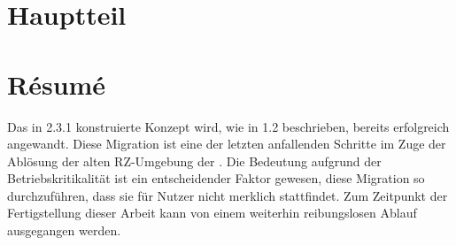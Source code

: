 \section{Hauptteil}
\section{Résumé}

Das in 2.3.1 konstruierte Konzept wird, wie in 1.2 beschrieben, bereits erfolgreich angewandt. Diese Migration ist eine der letzten anfallenden Schritte im Zuge der Ablösung der alten RZ-Umgebung der \Firma. Die Bedeutung aufgrund der Betriebskritikalität ist ein entscheidender Faktor gewesen, diese Migration so durchzuführen, dass sie für Nutzer nicht merklich stattfindet.
Zum Zeitpunkt der Fertigstellung dieser Arbeit kann von einem weiterhin reibungslosen Ablauf ausgegangen werden. 






